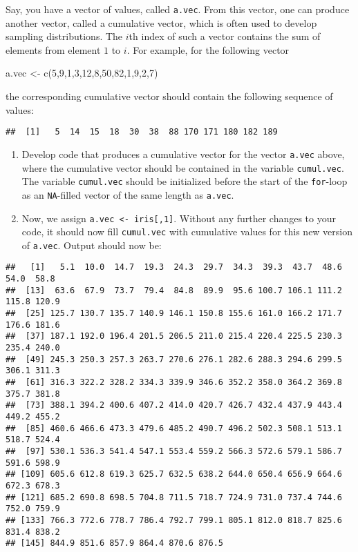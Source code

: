\documentclass[
]{book}
\newenvironment{Shaded}{\begin{snugshade}}{\end{snugshade}}
\newcommand{\DecValTok}[1]{\textcolor[rgb]{0.00,0.00,0.81}{#1}}
\newcommand{\FunctionTok}[1]{\textcolor[rgb]{0.00,0.00,0.00}{#1}}
\newcommand{\NormalTok}[1]{#1}
\newcommand{\OtherTok}[1]{\textcolor[rgb]{0.56,0.35,0.01}{#1}}
\providecommand{\tightlist}{%
  \setlength{\itemsep}{0pt}\setlength{\parskip}{0pt}}
\begin{document}
Say, you have a vector of values, called \texttt{a.vec}. From this vector, one can produce another vector, called a cumulative vector, which is often used to develop sampling distributions. The \(i\)th index of such a vector contains the sum of elements from element \(1\) to \(i\). For example, for the following vector

\begin{Shaded}
\begin{Highlighting}[]
\NormalTok{a.vec }\OtherTok{\textless{}{-}} \FunctionTok{c}\NormalTok{(}\DecValTok{5}\NormalTok{,}\DecValTok{9}\NormalTok{,}\DecValTok{1}\NormalTok{,}\DecValTok{3}\NormalTok{,}\DecValTok{12}\NormalTok{,}\DecValTok{8}\NormalTok{,}\DecValTok{50}\NormalTok{,}\DecValTok{82}\NormalTok{,}\DecValTok{1}\NormalTok{,}\DecValTok{9}\NormalTok{,}\DecValTok{2}\NormalTok{,}\DecValTok{7}\NormalTok{)}
\end{Highlighting}
\end{Shaded}

the corresponding cumulative vector should contain the following sequence of values:

\begin{verbatim}
##  [1]   5  14  15  18  30  38  88 170 171 180 182 189
\end{verbatim}

\begin{enumerate}
\def\labelenumi{\arabic{enumi}.}
\tightlist
\item
  Develop code that produces a cumulative vector for the vector \texttt{a.vec} above, where the cumulative vector should be contained in the variable \texttt{cumul.vec}. The variable \texttt{cumul.vec} should be initialized before the start of the \texttt{for}-loop as an \texttt{NA}-filled vector of the same length as \texttt{a.vec}.
\item
  Now, we assign \texttt{a.vec\ \textless{}-\ iris{[},1{]}}. Without any further changes to your code, it should now fill \texttt{cumul.vec} with cumulative values for this new version of \texttt{a.vec}. Output should now be:
\end{enumerate}

\begin{verbatim}
##   [1]   5.1  10.0  14.7  19.3  24.3  29.7  34.3  39.3  43.7  48.6  54.0  58.8
##  [13]  63.6  67.9  73.7  79.4  84.8  89.9  95.6 100.7 106.1 111.2 115.8 120.9
##  [25] 125.7 130.7 135.7 140.9 146.1 150.8 155.6 161.0 166.2 171.7 176.6 181.6
##  [37] 187.1 192.0 196.4 201.5 206.5 211.0 215.4 220.4 225.5 230.3 235.4 240.0
##  [49] 245.3 250.3 257.3 263.7 270.6 276.1 282.6 288.3 294.6 299.5 306.1 311.3
##  [61] 316.3 322.2 328.2 334.3 339.9 346.6 352.2 358.0 364.2 369.8 375.7 381.8
##  [73] 388.1 394.2 400.6 407.2 414.0 420.7 426.7 432.4 437.9 443.4 449.2 455.2
##  [85] 460.6 466.6 473.3 479.6 485.2 490.7 496.2 502.3 508.1 513.1 518.7 524.4
##  [97] 530.1 536.3 541.4 547.1 553.4 559.2 566.3 572.6 579.1 586.7 591.6 598.9
## [109] 605.6 612.8 619.3 625.7 632.5 638.2 644.0 650.4 656.9 664.6 672.3 678.3
## [121] 685.2 690.8 698.5 704.8 711.5 718.7 724.9 731.0 737.4 744.6 752.0 759.9
## [133] 766.3 772.6 778.7 786.4 792.7 799.1 805.1 812.0 818.7 825.6 831.4 838.2
## [145] 844.9 851.6 857.9 864.4 870.6 876.5
\end{verbatim}
\end{document}
